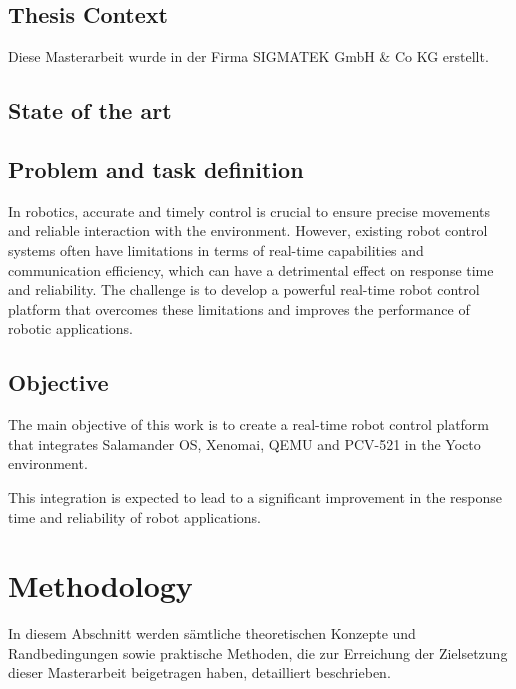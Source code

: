 \documentclass[MMR,Master,english]{twbook}
\begin{document}
\clearpage
\section{Thesis Context}
Diese Masterarbeit wurde in der Firma SIGMATEK GmbH \& Co KG erstellt. 





\clearpage
\section{State of the art}







\clearpage


\section{Problem and task definition}
In robotics, accurate and timely control is crucial to ensure precise movements and reliable interaction with the environment. However, existing robot control systems often have limitations in terms of real-time capabilities and communication efficiency, which can have a detrimental effect on response time and reliability. The challenge is to develop a powerful real-time robot control platform that overcomes these limitations and improves the performance of robotic applications.


\clearpage
\section{Objective}

The main objective of this work is to create a real-time robot control platform that integrates Salamander OS, Xenomai, QEMU and PCV-521 in the Yocto environment. 

This integration is expected to lead to a significant improvement in the response time and reliability of robot applications.


\clearpage
\chapter{Methodology}
 
In diesem Abschnitt werden sämtliche theoretischen Konzepte und Randbedingungen sowie praktische Methoden, die zur Erreichung der Zielsetzung dieser Masterarbeit beigetragen haben, detailliert beschrieben.
\end{document}

